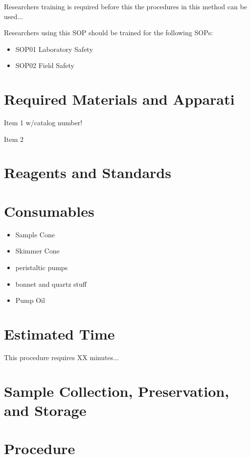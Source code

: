 \documentclass[12pt]{../SOP3_beta}\usepackage[]{graphicx}\usepackage[]{color}
\begin{document}
\NP Researchers training is required before this the procedures in this method can be used... 

\NP Researchers using this SOP should be trained for the following SOPs:

\begin{itemize}
  \item SOP01 Laboratory Safety
  \item SOP02 Field Safety
\end{itemize}

\section{Required Materials and Apparati}

\NP Item 1 w/catalog number!

\NP Item 2

\section{Reagents and Standards}

\section{Consumables}

\begin{itemize}
  \item Sample Cone
  \item Skimmer Cone
  \item peristaltic pumps
  \item bonnet and quartz stuff
  \item Pump Oil
\end{itemize}


\section{Estimated Time}

\NP This procedure requires XX minutes...

\section{Sample Collection, Preservation, and Storage}

\section{Procedure}
\end{document}
